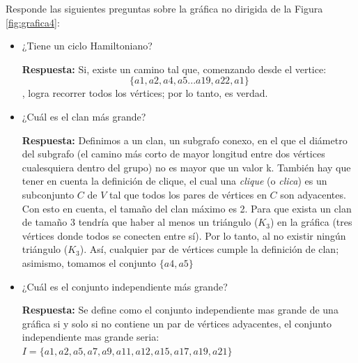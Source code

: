 Responde las siguientes preguntas sobre la gráfica no dirigida de la Figura \ref{fig:grafica4}: 
\begin{itemize}
    \item ¿Tiene un ciclo Hamiltoniano?
    
    \textbf{Respuesta:}
    Si, existe un camino tal que, comenzando desde el vertice: $$\{a1,a2,a4,a5...a19,a22,a1\}$$, logra recorrer todos los vértices; por lo tanto, es verdad.

    
    \item ¿Cuál es el clan más grande?
    
    \textbf{Respuesta:} Definimos a un clan, un subgrafo conexo, en el que el diámetro del subgrafo (el camino más corto de mayor longitud entre dos vértices cualesquiera dentro del grupo) no es mayor que un valor k. También hay que tener en cuenta la definición de clique, el cual una \emph{clique} (o \emph{clica}) es un subconjunto $C$ de $V$ tal que todos los pares de vértices en $C$ son adyacentes.\\
    
    
    Con esto en cuenta, el tamaño del clan máximo es 2. Para que exista un clan de tamaño 3 tendría que haber al menos un triángulo ($K_3$) en la gráfica (tres vértices donde todos se conecten entre sí). Por lo tanto, al no existir ningún triángulo ($K_3$). Así, cualquier par de vértices cumple la definición de clan; asimismo, tomamos el conjunto $\{a4,a5\}$

    
    \item ¿Cuál es el conjunto independiente más grande?
    
    \textbf{Respuesta:} Se define como el conjunto independiente mas grande de una gráfica si y solo si no contiene un par de vértices adyacentes, el conjunto independiente mas grande seria: $I=\{a1,a2,a5,a7,a9,a11,a12,a15,a17,a19,a21\}$

    

\end{itemize}
